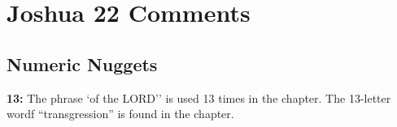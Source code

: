 \section{Joshua 22 Comments}

\subsection{Numeric Nuggets}
\textbf{13: } The phrase `of the LORD'' is used 13 times in the chapter. The 13-letter wordf ``transgression'' is found in the chapter.

